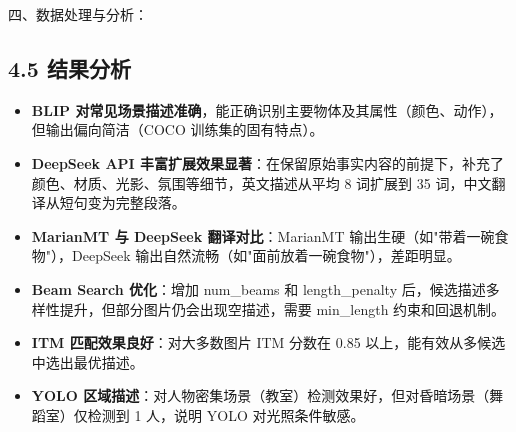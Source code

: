 \documentclass[12pt, a4paper]{article}
\begin{document}
\begin{labbox}{四、数据处理与分析：}{}
\subsection*{4.5 结果分析}

\begin{itemize}[leftmargin=2em, itemsep=0.3em]
    \item \textbf{BLIP 对常见场景描述准确}，能正确识别主要物体及其属性（颜色、动作），但输出偏向简洁（COCO 训练集的固有特点）。
    \item \textbf{DeepSeek API 丰富扩展效果显著}：在保留原始事实内容的前提下，补充了颜色、材质、光影、氛围等细节，英文描述从平均 8 词扩展到 35 词，中文翻译从短句变为完整段落。
    \item \textbf{MarianMT 与 DeepSeek 翻译对比}：MarianMT 输出生硬（如"带着一碗食物"），DeepSeek 输出自然流畅（如"面前放着一碗食物"），差距明显。
    \item \textbf{Beam Search 优化}：增加 num\_beams 和 length\_penalty 后，候选描述多样性提升，但部分图片仍会出现空描述，需要 min\_length 约束和回退机制。
    \item \textbf{ITM 匹配效果良好}：对大多数图片 ITM 分数在 0.85 以上，能有效从多候选中选出最优描述。
    \item \textbf{YOLO 区域描述}：对人物密集场景（教室）检测效果好，但对昏暗场景（舞蹈室）仅检测到 1 人，说明 YOLO 对光照条件敏感。
\end{itemize}

\end{labbox}
\end{document}
